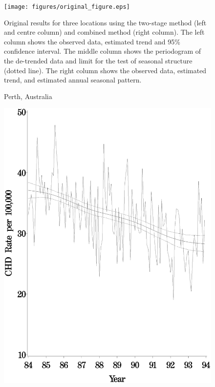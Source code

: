 \begin{figure}[!h]
    \centerline{\texttt{[image: figures/original\_figure.eps]}}

\caption{Original results for three locations using the two-stage method (left and centre column) and combined method (right column). The left column shows the observed data, estimated trend and 95\% confidence interval. The middle column shows the periodogram of the de-trended data and limit for the test of seasonal structure (dotted line). The right column shows the observed data, estimated trend, and estimated annual seasonal pattern.}
	\label{fig:original}
\end{figure}

\begin{figure}[!h]
\centerline{Perth, Australia}
	\centerline{
    \includegraphics[scale=0.2]{figures/trend_twostage_perth.eps}
}
\end{figure}
